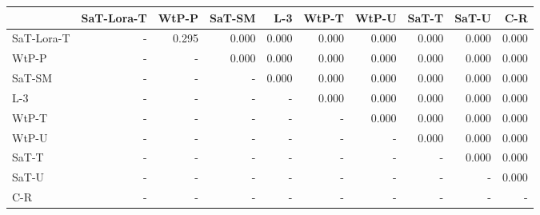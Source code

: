 \begin{tabular}{lrrrrrrrrr}
\toprule
 & SaT-Lora-T & WtP-P & SaT-SM & L-3 & WtP-T & WtP-U & SaT-T & SaT-U & C-R \\
\midrule
SaT-Lora-T & - & 0.295 & 0.000 & 0.000 & 0.000 & 0.000 & 0.000 & 0.000 & 0.000 \\
WtP-P & - & - & 0.000 & 0.000 & 0.000 & 0.000 & 0.000 & 0.000 & 0.000 \\
SaT-SM & - & - & - & 0.000 & 0.000 & 0.000 & 0.000 & 0.000 & 0.000 \\
L-3 & - & - & - & - & 0.000 & 0.000 & 0.000 & 0.000 & 0.000 \\
WtP-T & - & - & - & - & - & 0.000 & 0.000 & 0.000 & 0.000 \\
WtP-U & - & - & - & - & - & - & 0.000 & 0.000 & 0.000 \\
SaT-T & - & - & - & - & - & - & - & 0.000 & 0.000 \\
SaT-U & - & - & - & - & - & - & - & - & 0.000 \\
C-R & - & - & - & - & - & - & - & - & - \\
\bottomrule
\end{tabular}

